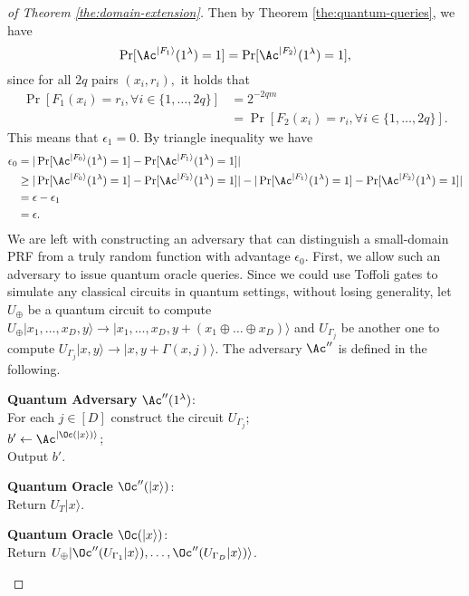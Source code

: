 \begin{proof}[of Theorem \ref{the:domain-extension}]
	Then by Theorem \ref{the:quantum-queries}, we have 
	$$\Pr[\Ac^{|F_1\rangle}(1^\lambda)=1] = \Pr[\Ac^{|F_2\rangle}(1^\lambda)=1],$$
	since for all $2q$ pairs $(x_i, r_i),$ it holds that 
	\begin{align*}
		\Pr[F_1(x_i)=r_i,\forall i\in\{1,\dots,2q\}]
		&=2^{-2qm}\\
		&=\Pr[F_2(x_i)=r_i,\forall i\in\{1,\dots,2q\}].
	\end{align*}
	This means that $\epsilon_1=0$. By triangle inequality we have
	\begin{align*}
		\epsilon_0
		&= |\Pr[\Ac^{|F_0\rangle}(1^\lambda)=1]-\Pr[\Ac^{|F_1\rangle}(1^\lambda)=1]|\\
		&\ge |\Pr[\Ac^{|F_0\rangle}(1^\lambda)=1]-\Pr[\Ac^{|F_2\rangle}(1^\lambda)=1]| - |\Pr[\Ac^{|F_1\rangle}(1^\lambda)=1]-\Pr[\Ac^{|F_2\rangle}(1^\lambda)=1]| \\
		&= \epsilon - \epsilon_1\\
		&= \epsilon.
	\end{align*}
%
We are left with constructing an adversary that can distinguish a small-domain PRF from a truly random function with advantage $\epsilon_0$. First, we allow such an adversary to issue quantum oracle queries. Since we could use Toffoli gates to simulate any classical circuits in quantum settings, without losing generality, let $U_\oplus$ be a quantum circuit to compute $U_\oplus|x_1,\dots,x_{D},y\rangle \to |x_1,\dots,x_{D},y+(x_1\oplus\dots\oplus x_{D})\rangle$ and $U_{\Gamma_j}$ be another one to compute $U_{\Gamma_j}|x,y\rangle\to|x,y+\Gamma(x,j)\rangle.$ The adversary $\Ac''$ is defined in the following.
	\begin{center}
		\begin{minipage}[t]{0.5\textwidth}
			\textbf{Quantum Adversary} $\Ac''(1^\lambda)$: \\
			For each $j\in[D]$ construct the circuit $U_{\Gamma_j}$;\\
			$b'\gets \Ac^{|\Oc(|x\rangle)\rangle}$;\\
			Output $b'$.
		\end{minipage}
		\begin{minipage}[t]{0.5\textwidth}
			\textbf{Quantum Oracle} $\Oc''(|x\rangle)$: \\
			Return $U_T|x\rangle$.
		\end{minipage}
		\begin{minipage}[t]{0.5\textwidth}
			\textbf{Quantum Oracle} $\Oc(|x\rangle)$: \\
			Return $U_\oplus|\Oc''(U_{\Gamma_1}|x\rangle),\dots,\Oc''(U_{\Gamma_{{D}}}|x\rangle)\rangle$.

\end{minipage}
\end{center}
\end{proof}
